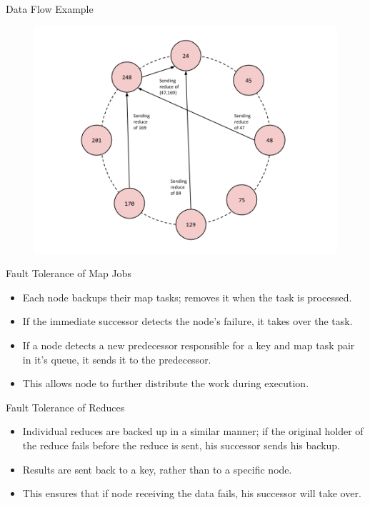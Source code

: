 \documentclass[11pt]{beamer}
\begin{document}
\begin{frame}{Data Flow Example}
\begin{figure}
    \includegraphics[width=0.85\linewidth]{CR_dataflow3}

\end{figure}
\end{frame}



\begin{frame}{Fault Tolerance of Map Jobs}
\begin{itemize}
	\item Each node backups their map tasks; removes it when the task is processed.
	\item If the immediate successor detects the node's failure, it takes over the task.
	\item If a node detects a new predecessor responsible for a key and map task pair in it's queue, it sends it to the predecessor.
	\item This allows node to further distribute the work during execution.
\end{itemize}
\end{frame}



\begin{frame}{Fault Tolerance of Reduces}
\begin{itemize}
	\item Individual reduces are backed up in a similar manner; if the original holder of the reduce fails before the reduce is sent, his successor sends his backup.
	\item Results are sent back to a key, rather than to a specific node.
	\item This ensures that if node receiving the data fails, his successor will take over.
\end{itemize}
\end{frame}
\end{document}
